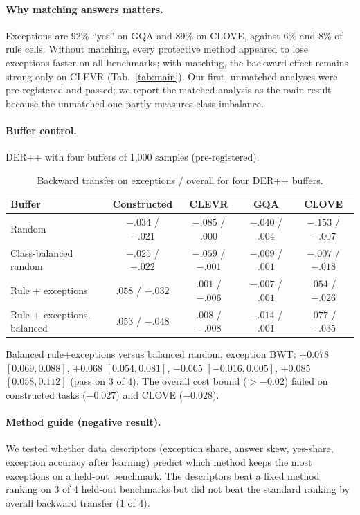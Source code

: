 \paragraph{Why matching answers matters.}
Exceptions are 92\% ``yes'' on GQA and 89\% on CLOVE, against 6\% and 8\% of rule cells.
Without matching, every protective method appeared to lose exceptions faster on all
benchmarks; with matching, the backward effect remains strong only on CLEVR (Tab.~\ref{tab:main}).
Our first, unmatched analyses were pre-registered and passed; we report the matched analysis
as the main result because the unmatched one partly measures class imbalance.

\paragraph{Buffer control.}
DER++ with four buffers of 1{,}000 samples (pre-registered).

\begin{table}[h]
\centering\small\setlength{\tabcolsep}{3pt}
\caption{Backward transfer on exceptions / overall for four DER++ buffers.}
\begin{tabular}{lcccc}
\toprule
Buffer & Constructed & CLEVR & GQA & CLOVE \\
\midrule
Random                         & $-.034$ / $-.021$ & $-.085$ / $.000$ & $-.040$ / $.004$ & $-.153$ / $-.007$ \\
Class-balanced random          & $-.025$ / $-.022$ & $-.059$ / $-.001$ & $-.009$ / $.001$ & $-.007$ / $-.018$ \\
Rule + exceptions              & $.058$ / $-.032$ & $.001$ / $-.006$ & $-.007$ / $.001$ & $.054$ / $-.026$ \\
Rule + exceptions, balanced    & $.053$ / $-.048$ & $.008$ / $-.008$ & $-.014$ / $.001$ & $.077$ / $-.035$ \\
\bottomrule
\end{tabular}
\end{table}

\noindent
Balanced rule+exceptions versus balanced random, exception BWT: $+0.078$ $[0.069, 0.088]$,
$+0.068$ $[0.054, 0.081]$, $-0.005$ $[-0.016, 0.005]$, $+0.085$ $[0.058, 0.112]$ (pass on 3 of
4). The overall cost bound ($>-0.02$) failed on constructed tasks ($-0.027$) and CLOVE
($-0.028$).

\paragraph{Method guide (negative result).}
We tested whether data descriptors (exception share, answer skew, yes-share, exception
accuracy after learning) predict which method keeps the most exceptions on a held-out
benchmark. The descriptors beat a fixed method ranking on 3 of 4 held-out benchmarks but did
not beat the standard ranking by overall backward transfer (1 of 4).

